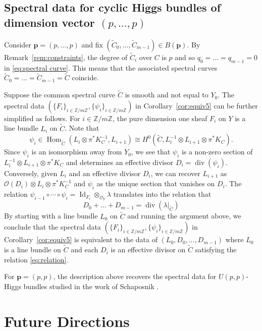 \documentclass[11pt]{amsart}
\theoremstyle{plain}
\theoremstyle{definition}
\theoremstyle{remark}
\def\O{\mathcal{O}}
\def\zm{\mathbb{Z}/m\mathbb{Z}}
\def\tC{\widetilde{C}}
\begin{document}
    



\subsection{Spectral data for cyclic Higgs bundles of dimension vector $(p,\dots, p)$}\label{sec:equal dim}
Consider $\bm{p} = (p,\dots, p)$ and fix $(\tC_0,\dots, \tC_{m-1})\in B(\bm{p})$. By Remark~\ref{rem:constraints}, the degree of $\tC_i$ over $C$ is $p$ and so $q_0= \dots = q_{m-1}=0$ in \ref{eq:spectral curve}. This means that the associated spectral curves $\tC_0= \dots= \tC_{m-1}=\tC$  coincide. 

Suppose the common spectral curve $\tC$ is smooth and not equal to $Y_0$. The spectral data $(\{F_i\}_{i\in\zm}, \{\psi_i\}_{i\in\zm})$ in Corollary~\ref{cor:equiv5} can be further simplified as follows. For $i\in \zm$, the pure dimension one sheaf $F_i$ on $Y$ is a line bundle $L_i$ on $\tC$. Note that
\[\psi_i\in \operatorname{Hom}_{\tC}(L_i\otimes\pi^*K_C^{-1}, L_{i+1})\cong H^0(\tC,L_i^{-1}\otimes L_{i+1}\otimes  \pi^*K_C).\]
Since $\psi_i$ is an isomorphism away from $Y_0$, we see that $\psi_i$ is a non-zero section of $L_i^{-1}\otimes L_{i+1}\otimes  \pi^*K_C$ and determines an effective divisor $D_i = \operatorname{div}(\psi_i)$. Conversely, given $L_i$ and an effective divisor $D_i$, we can recover $L_{i+1}$ as $\O(D_i)\otimes L_i\otimes \pi^*K_C^{-1}$ and $\psi_i$ as the unique section that vanishes on $D_i$. The relation $\psi_{i-1}\circ\cdots \circ \psi_{i} = \operatorname{Id}_{F_i}\otimes_{\O_Y} \lambda $ translates into the relation that 
\begin{equation}\label{eq:relation}
    D_0+\dots +D_{m-1}= \operatorname{div}(\lambda|_{\tC})
\end{equation}
By starting with a line bundle $L_0$ on $\tC$ and running the argument above, we conclude that the spectral data $(\{F_i\}_{i\in\zm}, \{\psi_i\}_{i\in\zm})$ in Corollary~\ref{cor:equiv5} is equivalent to the data of $(L_0, D_0,\dots, D_{m-1})$ where $L_0$ is a line bundle on $\tC$ and each $D_i$ is an effective divisor on $\tC$ satisfying the relation \ref{eq:relation}.

For $\bm{p}= (p,p)$, the description above recovers the spectral data for $U(p,p)$-Higgs bundles studied in the work of Schaposnik \cite{schaposnik14}. 







\section{Future Directions}\label{sec:future}
\end{document}
